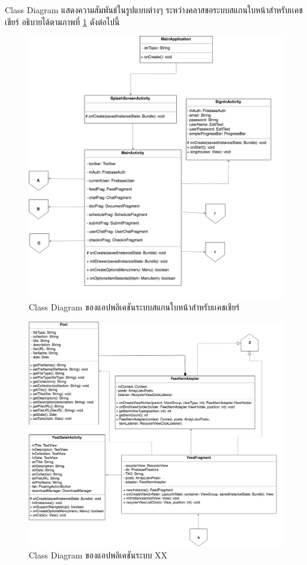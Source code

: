 \newpage
	Class Diagram แสดงความสัมพันธ์ในรูปแบบต่างๆ ระหว่างคลาสขอระบบสแกนใบหน้าสำหรับเเคชเชียร์ อธิบายได้ตามภาพที่ \ref{Fig:MainActivity20C} ดังต่อไปนี้
	\begin{figure}[H]
		\includegraphics[width=1.0\columnwidth]{Figures/3/Class/MainActivity}
		\caption{Class Diagram ของแอปพลิเคชันระบบสแกนใบหน้าสำหรับเเคชเชียร์}
		\label{Fig:MainActivity20C}
	\end{figure}
	\begin{figure}[H]
		\includegraphics[width=1.0\columnwidth]{Figures/3/Class/Feed}
		\caption{Class Diagram ของแอปพลิเคชันระบบ XX}
		\label{Fig:FeedC}
	\end{figure}
